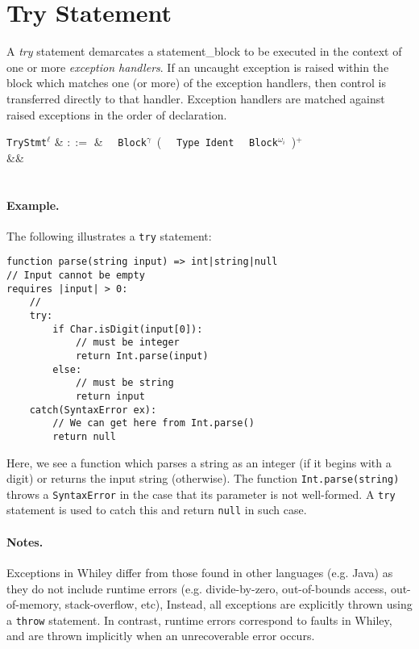\section{Try Statement}
\label{c_stmts_try_catch}
A {\em try} statement demarcates a \gls{statement_block} to be executed in the context of one or more {\em exception handlers}.  If an uncaught exception is raised within the block which matches one (or more) of the exception handlers, then control is transferred directly to that handler.  Exception handlers are matched against raised exceptions in the order of declaration.

\begin{syntax}
  \verb+TryStmt+$^\ell$ & $::=$  & \ \token{:}\ \verb+Block+$^\gamma$\ \big(\  \token{(}\ \verb+Type+\ \verb+Ident+\ \token{)} \token{:}\ \verb+Block+$^{\omega_i}$\ \big)$^+$\\
&&\\
\\
\end{syntax}

\paragraph{Example.}  The following illustrates a \lstinline{try} statement:

\begin{lstlisting}
function parse(string input) => int|string|null
// Input cannot be empty
requires |input| > 0:
    //
    try:
        if Char.isDigit(input[0]):
            // must be integer
            return Int.parse(input)
        else:
            // must be string
            return input
    catch(SyntaxError ex):
        // We can get here from Int.parse()
        return null
\end{lstlisting}
Here, we see a function which parses a string as an integer (if it begins with a digit) or returns the input string (otherwise).  The function \lstinline{Int.parse(string)} throws a \lstinline{SyntaxError} in the case that its parameter is not well-formed.  A \lstinline{try} statement is used to catch this and return \lstinline{null} in such case.

\paragraph{Notes.} Exceptions in Whiley differ from those found in other languages (e.g. Java) as they do not include runtime errors (e.g. divide-by-zero, out-of-bounds access, out-of-memory, stack-overflow, etc),  Instead, all exceptions are explicitly thrown using a \lstinline{throw} statement.  In contrast, runtime errors correspond to \gls{fault}s in Whiley, and are thrown implicitly when an unrecoverable error occurs.

